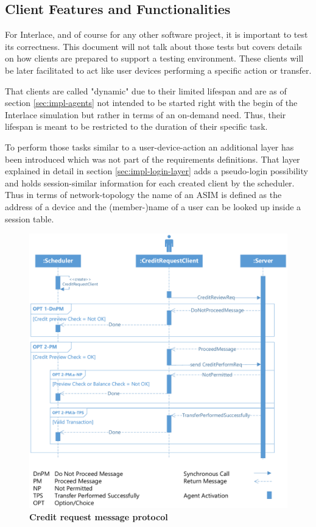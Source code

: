 \subsection{Client Features and Functionalities}
\label{subsec:impl-client-features}

For Interlace, and of course for any other software project, it is important to test its correctness. This document will not talk about those tests but covers details on how clients are prepared to support a testing environment. These clients will be later facilitated to act like user devices performing a specific action or transfer.

That clients are called "dynamic" due to their limited lifespan and are as of section \ref{sec:impl-agents} not intended to be started right with the begin of the Interlace simulation but rather in terms of an on-demand need. Thus, their lifespan is meant to be restricted to the duration of their specific task.

To perform those tasks similar to a user-device-action an additional layer has been introduced which was not part of the requirements definitions. That layer explained in detail in section \ref{sec:impl-login-layer} adds a pseudo-login possibility and holds session-similar information for each created client by the scheduler. Thus in terms of network-topology the name of an ASIM is defined as the address of a device and the (member-)name of a user can be looked up inside a session table.

\begin{figure}[htbp]
  \centering
  \includegraphics[width=1.0\textwidth]{Figures/creditrequest}
  \caption{\bf\small Credit request message protocol}
  \label{fig:impl-msg-crc}
\end{figure}

